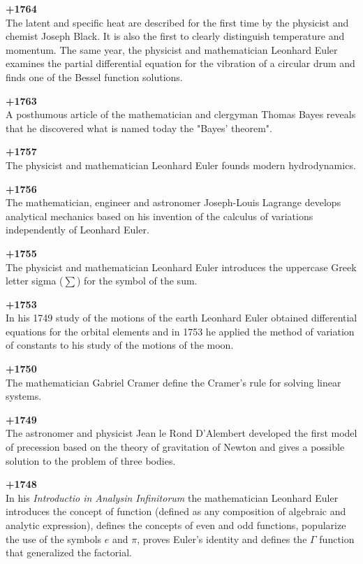 \textbf{+1764}\\
The latent and specific heat are described for the first time by the physicist and chemist Joseph Black. It is also the first to clearly distinguish temperature and momentum. The same year, the physicist and mathematician Leonhard Euler examines the partial differential equation for the vibration of a circular drum and finds one of the Bessel function solutions.

\textbf{+1763}\\
A posthumous article of the mathematician and clergyman Thomas Bayes reveals that he discovered what is named today the "Bayes' theorem".

\textbf{+1757}\\
The physicist and mathematician Leonhard Euler founds modern hydrodynamics.

\textbf{+1756}\\
The mathematician, engineer and astronomer Joseph-Louis Lagrange develops analytical mechanics based on his invention of the calculus of variations independently of Leonhard Euler.

\textbf{+1755}\\
The physicist and mathematician Leonhard Euler introduces the uppercase Greek letter sigma ($\sum$) for the symbol of the sum.

\textbf{+1753}\\
In his 1749 study of the motions of the earth Leonhard Euler obtained differential equations for the orbital elements and in 1753 he applied the method of variation of constants to his study of the motions of the moon.

\textbf{+1750}\\
The mathematician Gabriel Cramer define the Cramer's rule for solving linear systems.

\textbf{+1749}\\
The astronomer and physicist Jean le Rond D'Alembert developed the first model of precession based on the theory of gravitation of Newton and gives a possible solution to the problem of three bodies.

\textbf{+1748}\\
In his \textit{Introductio in Analysin Infinitorum} the mathematician Leonhard Euler introduces the concept of function (defined as any composition of algebraic and analytic expression), defines the concepts of even and odd functions, popularize the use of the symbols $e$ and $\pi$, proves Euler's identity and defines the $\Gamma$ function that generalized the factorial.

